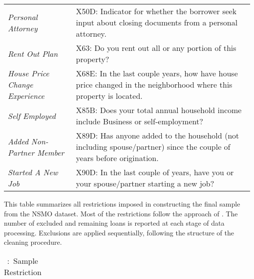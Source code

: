 \documentclass[11pt]{article}
\begin{document}
{\begin{table}[!h]
{\begin{tabular}{lp{11cm}}
\textit{Personal Attorney} & X50D: Indicator for whether the borrower seek input about closing documents from a personal attorney. \\
\textit{Rent Out Plan
} & X63: Do you rent out all or any portion of this property?\\
\textit{House Price Change Experience} & X68E: In the last couple years, how have house price changed in the neighborhood where this property is located. \\
\textit{Self Employed} & X85B: Does your total annual household income include Business or self-employment? \\
\textit{Added Non-Partner Member} & X89D: Has anyone added to the household (not including spouse/partner) since the couple of years before origination. \\
\textit{Started A New Job} & X90D: In the last couple of years, have 
you or your spouse/partner starting a new job? \\

\bottomrule
\end{tabular}
}
\end{table}
\FloatBarrier



\begin{table}[!h]
\captionsetup{justification=justified,singlelinecheck=false}
\footnotesize
\caption{:\ Sample Restriction}
\label{tab:sample_restriction}
\vspace{0.5em}

\begin{minipage}{\textwidth}
\small
This table summarizes all restrictions imposed in constructing the final sample from the NSMO dataset. Most of the restrictions follow the approach of \citet{fuster2022predictably}. The number of excluded and remaining loans is reported at each stage of data processing. Exclusions are applied sequentially, following the structure of the cleaning procedure.
\end{minipage}

\vspace{1em}
\centering
\begin{tabular}{p{10cm}cc}
\toprule



\end{tabular}
\end{table}}
\end{document}
